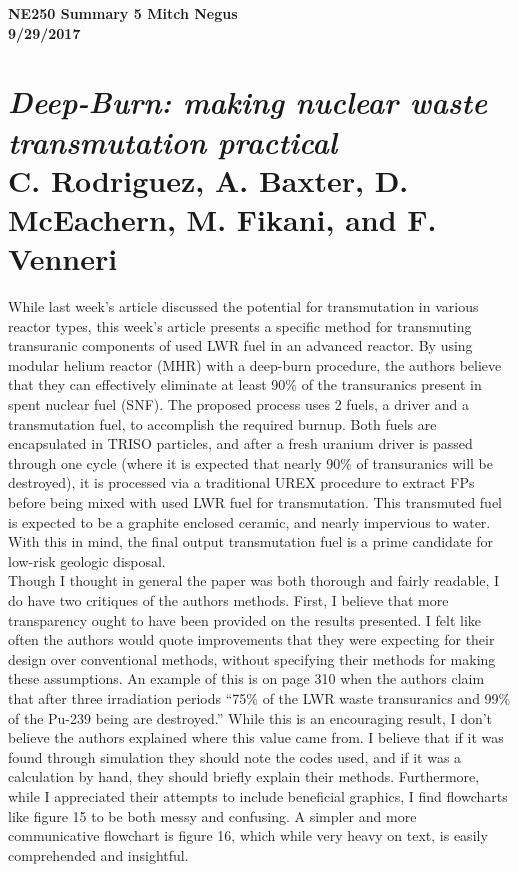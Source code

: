 \documentclass{report}
\newcommand{\tab}{\-\hspace{1cm}}
\begin{document}
\thispagestyle{empty}

{\bf {\large {NE250 Summary {5} \hfill Mitch Negus\\
		\hspace*{\fill} 9/29/2017\\ }}}
\section*{\textsl{Deep-Burn: making nuclear waste transmutation practical} \\ \normalsize C. Rodriguez, A. Baxter, D. McEachern, M. Fikani, and F. Venneri}

\tab While last week's article discussed the potential for transmutation in various reactor types, this week's article presents a specific method for transmuting transuranic components of used LWR fuel in an advanced reactor. By using modular helium reactor (MHR) with a deep-burn procedure, the authors believe that they can effectively eliminate at least 90\% of the transuranics present in spent nuclear fuel (SNF). The proposed process uses 2 fuels, a driver and a transmutation fuel, to accomplish the required burnup. Both fuels are encapsulated in TRISO particles, and after a fresh uranium driver is passed through one cycle (where it is expected that nearly 90\% of transuranics will be destroyed), it is processed via a traditional UREX procedure to extract FPs before being mixed with used LWR fuel for transmutation. This transmuted fuel is expected to be a graphite enclosed ceramic, and nearly impervious to water. With this in mind, the final output transmutation fuel is a prime candidate for low-risk geologic disposal.\\
\tab Though I thought in general the paper was both thorough and fairly readable, I do have two critiques of the authors methods. First, I believe that more transparency ought to have been provided on the results presented. I felt like often the authors would quote improvements that they were expecting for their design over conventional methods, without specifying their methods for making these assumptions. An example of this is on page 310 when the authors claim that after three irradiation periods ``75\% of the LWR waste transuranics and 99\% of the Pu-239 being are destroyed.'' While this is an encouraging result, I don't believe the authors explained where this value came from. I believe that if it was found through simulation they should note the codes used, and if it was a calculation by hand, they should briefly explain their methods. Furthermore, while I appreciated their attempts to include beneficial graphics, I find flowcharts like figure 15 to be both messy and confusing. A simpler and more communicative flowchart is figure 16, which while very heavy on text, is easily comprehended and insightful.
\end{document}
